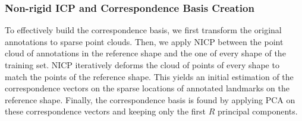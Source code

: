 \subsubsection*{Non-rigid ICP and Correspondence Basis Creation} \label{sec:trabasis}



To effectively build the correspondence basis, we first transform the original annotations to sparse point clouds. Then, we apply NICP \cite{Amber2007} between the point cloud of annotations in the reference shape and the one of every shape of the training set. NICP iteratively deforms the cloud of points of every shape to match the points of the reference shape. This yields an initial estimation of the correspondence vectors on the sparse locations of annotated landmarks on the reference shape. Finally, the correspondence basis is found by applying PCA on these  correspondence vectors and keeping only the first $R$ principal components.





